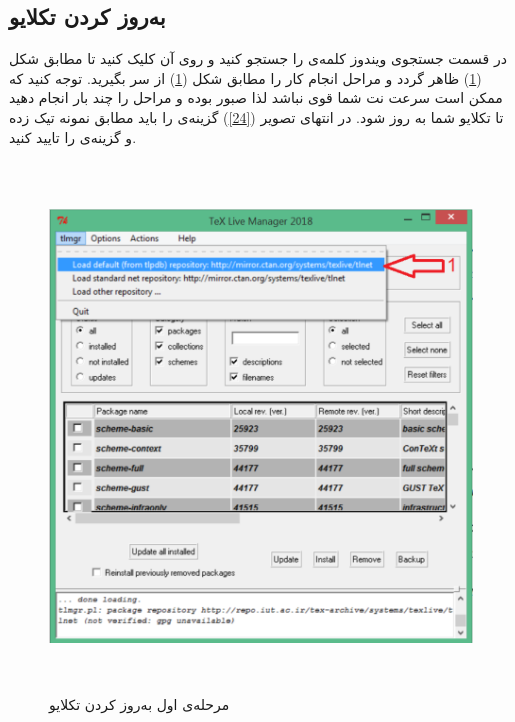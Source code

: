 \documentclass{article}
\begin{document}
\subsection{به‌روز کردن تکلایو}
در قسمت جستجوی ویندوز کلمه‌ی
را جستجو کنید و روی آن کلیک کنید تا
مطابق شکل
(\ref{23})
 ظاهر گردد و مراحل انجام کار را مطابق شکل
(\ref{23})
از سر بگیرید. توجه کنید که ممکن است سرعت نت شما قوی نباشد لذا
صبور بوده و مراحل را چند بار انجام دهید تا تکلایو شما به روز شود.
در انتهای تصویر 
(\ref{24})
 گزینه‌ی
 را باید مطابق نمونه تیک زده و گزینه‌ی
را تایید کنید.

\begin{figure}[H]
\centering
\includegraphics[width=\textwidth,height=14cm]{image/sh14}
\caption{مرحله‌ی اول به‌روز کردن تکلایو}
\label{23}
\end{figure}
\end{document}
